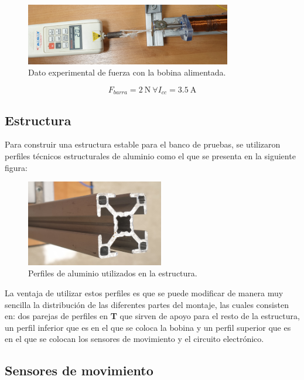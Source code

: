 \begin{figure}[H]
    \centering
    \includegraphics[width=9cm]{FigurasMemoria/dinamometro.jpg}
    \caption{Dato experimental de fuerza con la bobina alimentada.}
    \label{fig:dinamometro} %
\end{figure}

\[F_{barra}=2~\text{N}~\forall I_{cc}=3.5~\text{A}\]

\subsection{Estructura}
\label{subsec:estructura}
Para construir una estructura estable para el banco de pruebas, se utilizaron perfiles técnicos estructurales de aluminio como el que se presenta en la siguiente figura:

\begin{figure}[H]
    \centering
    \includegraphics[width=6cm]{FigurasMemoria/perfiles.jpg}
    \caption{Perfiles de aluminio utilizados en la estructura.}
    \label{fig:perfiles} %
\end{figure}

La ventaja de utilizar estos perfiles es que se puede modificar de manera muy sencilla la distribución de las diferentes partes del montaje, las cuales consisten en: dos parejas de perfiles en \textbf{T} que sirven de apoyo para el resto de la estructura, un perfil inferior que es en el que se coloca la bobina y un perfil superior que es en el que se colocan los sensores de movimiento y el circuito electrónico.

\subsection{Sensores de movimiento}
\label{subsec:sensoresmov}

